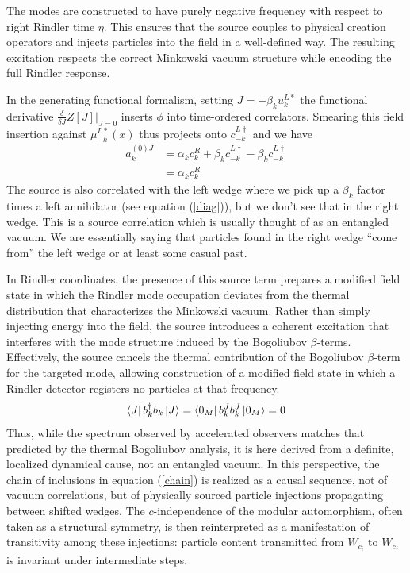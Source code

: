 \documentclass[12pt,a4paper]{article}
\begin{document}
The modes are constructed to have purely negative frequency with respect to right Rindler time $\eta$. This ensures that the source couples to physical creation operators and injects particles into the field in a well-defined way. The resulting excitation respects the correct Minkowski vacuum structure while encoding the full Rindler response.

In the generating functional formalism, setting $J = -\beta_k u_k^{L*}$ the functional derivative $\frac{\delta}{\delta J}Z[J]|_{J=0}$ inserts $\phi$ into time-ordered correlators. Smearing this field insertion against $\mu_{-k}^{L*}(x)$ thus projects onto $c_{-k}^{L\dagger}$ and we have
\begin{equation}
\begin{array}{ll}
  a_k^{(0)J} &= \alpha_k c_k^R + \beta_k c_{-k}^{L\dagger} -  \beta_k c_{-k}^{L\dagger} \\
  &= \alpha_k c_k^R
\end{array}
\end{equation}
The source is also correlated with the left wedge where we pick up a $\beta_k$ factor times a left annihilator (see equation (\ref{diag})), but we don't see that in the right wedge.  This is a source correlation which is usually thought of as an entangled vacuum.  We are essentially saying that particles found in the right wedge ``come from'' the left wedge or at least some casual past.

In Rindler coordinates, the presence of this source term prepares a modified field state in which the Rindler mode occupation deviates from the thermal distribution that characterizes the Minkowski vacuum. Rather than simply injecting energy into the field, the source introduces a coherent excitation that interferes with the mode structure induced by the Bogoliubov $\beta$-terms. Effectively, the source cancels the thermal contribution of the Bogoliubov $\beta$-term for the targeted mode, allowing construction of a modified field state in which a Rindler detector registers no particles at that frequency.
\begin{equation}
  \bra{J}  b_k^{\dagger} b_k \ket{J} = \bra{0_M}  b_k^{J} b^{J}_k \ket{0_M} = 0
\end{equation}
Thus, while the spectrum observed by accelerated observers matches that predicted by the thermal Bogoliubov analysis, it is here derived from a definite, localized dynamical cause, not an entangled vacuum. In this perspective, the chain of inclusions in equation (\ref{chain}) is realized as a causal sequence, not of vacuum correlations, but of physically sourced particle injections propagating between shifted wedges. The $c$-independence of the modular automorphism, often taken as a structural symmetry, is then reinterpreted as a manifestation of transitivity among these injections: particle content transmitted from $W_{c_i}$ to $W_{c_j}$ is invariant under intermediate steps.
\end{document}

